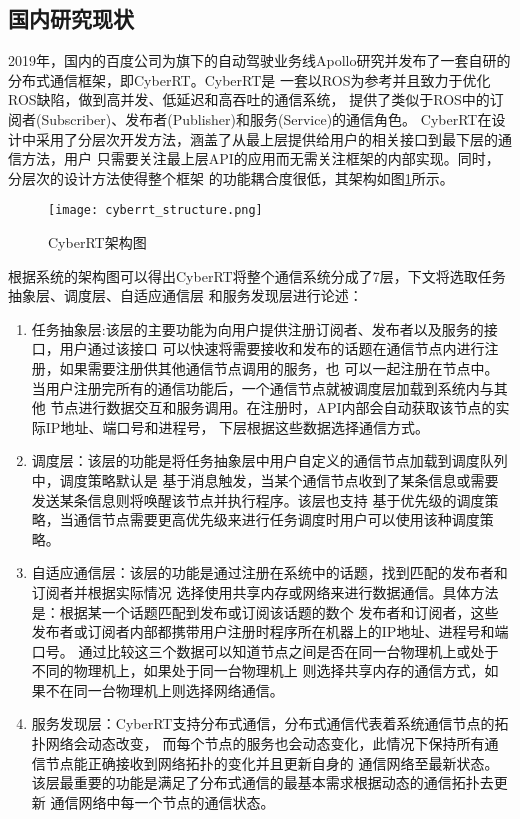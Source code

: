 \subsection{国内研究现状}
2019年，国内的百度公司为旗下的自动驾驶业务线Apollo研究并发布了一套自研的分布式通信框架，即CyberRT。CyberRT是
一套以ROS为参考并且致力于优化ROS缺陷，做到高并发、低延迟和高吞吐的通信系统，
提供了类似于ROS中的订阅者(Subscriber)、发布者(Publisher)和服务(Service)的通信角色。
CyberRT在设计中采用了分层次开发方法，涵盖了从最上层提供给用户的相关接口到最下层的通信方法，用户
只需要关注最上层API的应用而无需关注框架的内部实现。同时，分层次的设计方法使得整个框架
的功能耦合度很低，其架构如图\ref{cyberrt_structure}所示\cite{cyberrt}。
\begin{figure}[H]
  \centering
  \texttt{[image: cyberrt\_structure.png]}
  \caption{CyberRT架构图}
  \label{cyberrt_structure}
\end{figure}
根据系统的架构图可以得出CyberRT将整个通信系统分成了7层，下文将选取任务抽象层、调度层、自适应通信层
和服务发现层进行论述：
\begin{enumerate}
  \item 任务抽象层:该层的主要功能为向用户提供注册订阅者、发布者以及服务的接口，用户通过该接口
  可以快速将需要接收和发布的话题在通信节点内进行注册，如果需要注册供其他通信节点调用的服务，也
  可以一起注册在节点中。当用户注册完所有的通信功能后，一个通信节点就被调度层加载到系统内与其他
  节点进行数据交互和服务调用。在注册时，API内部会自动获取该节点的实际IP地址、端口号和进程号，
  下层根据这些数据选择通信方式。
  \item 调度层：该层的功能是将任务抽象层中用户自定义的通信节点加载到调度队列中，调度策略默认是
  基于消息触发，当某个通信节点收到了某条信息或需要发送某条信息则将唤醒该节点并执行程序。该层也支持
  基于优先级的调度策略，当通信节点需要更高优先级来进行任务调度时用户可以使用该种调度策略。
  \item 自适应通信层：该层的功能是通过注册在系统中的话题，找到匹配的发布者和订阅者并根据实际情况
  选择使用共享内存或网络来进行数据通信。具体方法是：根据某一个话题匹配到发布或订阅该话题的数个
  发布者和订阅者，这些发布者或订阅者内部都携带用户注册时程序所在机器上的IP地址、进程号和端口号。
  通过比较这三个数据可以知道节点之间是否在同一台物理机上或处于不同的物理机上，如果处于同一台物理机上
  则选择共享内存的通信方式，如果不在同一台物理机上则选择网络通信。
  \item 服务发现层：CyberRT支持分布式通信，分布式通信代表着系统通信节点的拓扑网络会动态改变，
  而每个节点的服务也会动态变化，此情况下保持所有通信节点能正确接收到网络拓扑的变化并且更新自身的
  通信网络至最新状态。该层最重要的功能是满足了分布式通信的最基本需求根据动态的通信拓扑去更新
  通信网络中每一个节点的通信状态。
\end{enumerate}
